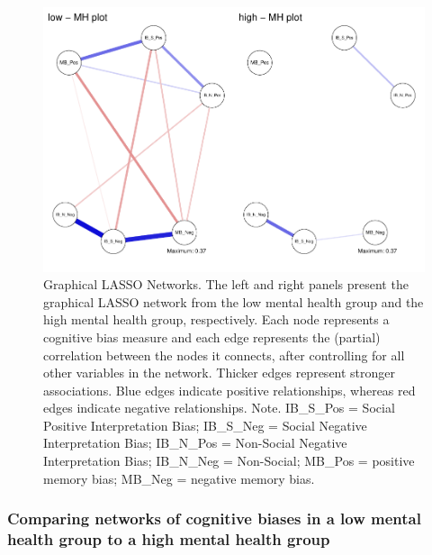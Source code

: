 \documentclass[man,floatsintext]{apa6}
\begin{document}
\begin{figure}
\centering
\includegraphics{script_files/figure-latex/unnamed-chunk-1-1.pdf}
\caption{\label{fig:unnamed-chunk-1}Graphical LASSO Networks. The left and right panels present the graphical LASSO network from the low mental health group and the high mental health group, respectively. Each node represents a cognitive bias measure and each edge represents the (partial) correlation between the nodes it connects, after controlling for all other variables in the network. Thicker edges represent stronger associations. Blue edges indicate positive relationships, whereas red edges indicate negative relationships.
Note. IB\_S\_Pos = Social Positive Interpretation Bias; IB\_S\_Neg = Social Negative Interpretation Bias; IB\_N\_Pos = Non-Social Negative Interpretation Bias; IB\_N\_Neg = Non-Social; MB\_Pos = positive memory bias; MB\_Neg = negative memory bias.}
\end{figure}

\hypertarget{comparing-networks-of-cognitive-biases-in-a-low-mental-health-group-to-a-high-mental-health-group}{%
\subsubsection{Comparing networks of cognitive biases in a low mental health group to a high mental health group}\label{comparing-networks-of-cognitive-biases-in-a-low-mental-health-group-to-a-high-mental-health-group}}
\end{document}
